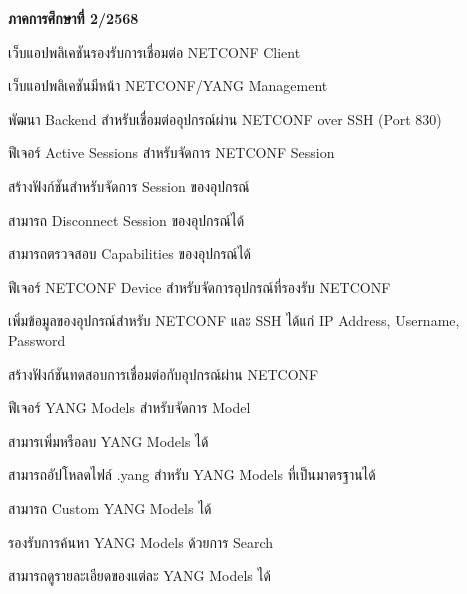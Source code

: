 \hspace*{1 cm}\textbf{ภาคการศึกษาที่ 2/2568}
\begin{mycustomenum2}
    \item เว็บแอปพลิเคชันรองรับการเชื่อมต่อ NETCONF Client
    \begin{mycustomenum2}
        \item เว็บแอปพลิเคชันมีหน้า NETCONF/YANG Management
        \item พัฒนา Backend สำหรับเชื่อมต่ออุปกรณ์ผ่าน NETCONF over SSH (Port 830)
    \end{mycustomenum2}

    \item ฟีเจอร์ Active Sessions สำหรับจัดการ NETCONF Session 
    \begin{mycustomenum2}
        \item สร้างฟังก์ชันสำหรับจัดการ Session ของอุปกรณ์
            \begin{mycustomenum2}
                \item สามารถ Disconnect Session ของอุปกรณ์ได้
            \end{mycustomenum2}
        \item สามารถตรวจสอบ Capabilities ของอุปกรณ์ได้ 
    \end{mycustomenum2}

    \item ฟีเจอร์ NETCONF Device สำหรับจัดการอุปกรณ์ที่รองรับ NETCONF
    \begin{mycustomenum2}
        \item เพิ่มข้อมูลของอุปกรณ์สำหรับ NETCONF และ SSH ได้แก่ IP Address, Username, Password
        \item สร้างฟังก์ชันทดสอบการเชื่อมต่อกับอุปกรณ์ผ่าน NETCONF
    \end{mycustomenum2}

    \vspace{1em}
    \item ฟีเจอร์ YANG Models สำหรับจัดการ Model
    \begin{mycustomenum2}
        \item สามารเพิ่มหรือลบ YANG Models ได้ 
        \item สามารถอัปโหลดไฟล์ .yang สำหรับ YANG Models ที่เป็นมาตรฐานได้
        \item สามารถ Custom YANG Models ได้
        \item รองรับการค้นหา YANG Models ด้วยการ Search
        \item สามารถดูรายละเอียดของแต่ละ YANG Models ได้
    \end{mycustomenum2}


\end{mycustomenum2}
